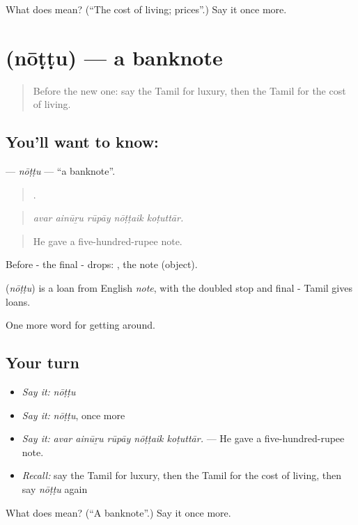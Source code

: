 \begin{tcolorbox}[breakable,colback=teal!4,colframe=teal!35!black,title={Before you move on}]
What does  mean? (\textquotedblleft{}The cost of living; prices\textquotedblright{}.) Say it once more.
\end{tcolorbox}
\section[\texorpdfstring{\ta{நோட்டு} (nōṭṭu)}{நோட்டு (nōṭṭu)}]{ (nōṭṭu) — a banknote}

\label{lesson:TA-C450-nottu}



\begin{quote}
Before the new one: say the Tamil for luxury, then the Tamil for the cost of living.
\end{quote}

\subsection*{You'll want to know: }
\textbf{} — \emph{nōṭṭu} — \textquotedblleft{}a banknote\textquotedblright{}.

\begin{quote}
    .
\end{quote}

\begin{quote}
\emph{avar ainūṟu rūpāy nōṭṭaik koṭuttār.}
\end{quote}

\begin{quote}
He gave a five-hundred-rupee note.
\end{quote}

Before - the final - drops: , the note (object).

\begin{cousinweb}
\textbf{} (\emph{nōṭṭu}) is a loan from English \emph{note}, with the doubled stop and final - Tamil gives loans.
\end{cousinweb}

\begin{grammarlens}[title={What you've built}]
One more word for getting around.
\end{grammarlens}

\subsection*{Your turn}
\begin{itemize}
\raggedright
  \item \emph{Say it:} \emph{nōṭṭu}
  \item \emph{Say it:} \emph{nōṭṭu}, once more
  \item \emph{Say it:} \emph{avar ainūṟu rūpāy nōṭṭaik koṭuttār.} — He gave a five-hundred-rupee note.
  \item \emph{Recall:} say the Tamil for luxury, then the Tamil for the cost of living, then say \emph{nōṭṭu} again
\end{itemize}

\begin{tcolorbox}[breakable,colback=teal!4,colframe=teal!35!black,title={Before you move on}]
What does  mean? (\textquotedblleft{}A banknote\textquotedblright{}.) Say it once more.
\end{tcolorbox}

